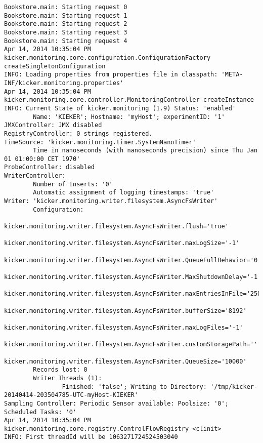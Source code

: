 \setTextListing
\begin{lstlisting}[caption=Execution of the Bookstore with AspectJ trace instrumentation (Section~\ref{sec:traceAnalysis:instr:AspectJ})]
Bookstore.main: Starting request 0
Bookstore.main: Starting request 1
Bookstore.main: Starting request 2
Bookstore.main: Starting request 3
Bookstore.main: Starting request 4
Apr 14, 2014 10:35:04 PM kicker.monitoring.core.configuration.ConfigurationFactory createSingletonConfiguration
INFO: Loading properties from properties file in classpath: 'META-INF/kicker.monitoring.properties'
Apr 14, 2014 10:35:04 PM kicker.monitoring.core.controller.MonitoringController createInstance
INFO: Current State of kicker.monitoring (1.9) Status: 'enabled'
        Name: 'KIEKER'; Hostname: 'myHost'; experimentID: '1'
JMXController: JMX disabled
RegistryController: 0 strings registered.
TimeSource: 'kicker.monitoring.timer.SystemNanoTimer'
        Time in nanoseconds (with nanoseconds precision) since Thu Jan 01 01:00:00 CET 1970'
ProbeController: disabled
WriterController:
        Number of Inserts: '0'
        Automatic assignment of logging timestamps: 'true'
Writer: 'kicker.monitoring.writer.filesystem.AsyncFsWriter'
        Configuration:
                kicker.monitoring.writer.filesystem.AsyncFsWriter.flush='true'
                kicker.monitoring.writer.filesystem.AsyncFsWriter.maxLogSize='-1'
                kicker.monitoring.writer.filesystem.AsyncFsWriter.QueueFullBehavior='0'
                kicker.monitoring.writer.filesystem.AsyncFsWriter.MaxShutdownDelay='-1'
                kicker.monitoring.writer.filesystem.AsyncFsWriter.maxEntriesInFile='25000'
                kicker.monitoring.writer.filesystem.AsyncFsWriter.bufferSize='8192'
                kicker.monitoring.writer.filesystem.AsyncFsWriter.maxLogFiles='-1'
                kicker.monitoring.writer.filesystem.AsyncFsWriter.customStoragePath=''
                kicker.monitoring.writer.filesystem.AsyncFsWriter.QueueSize='10000'
        Records lost: 0
        Writer Threads (1): 
                Finished: 'false'; Writing to Directory: '/tmp/kicker-20140414-203504785-UTC-myHost-KIEKER'
Sampling Controller: Periodic Sensor available: Poolsize: '0'; Scheduled Tasks: '0'
Apr 14, 2014 10:35:04 PM kicker.monitoring.core.registry.ControlFlowRegistry <clinit>
INFO: First threadId will be 1063271724524503040
\end{lstlisting}


